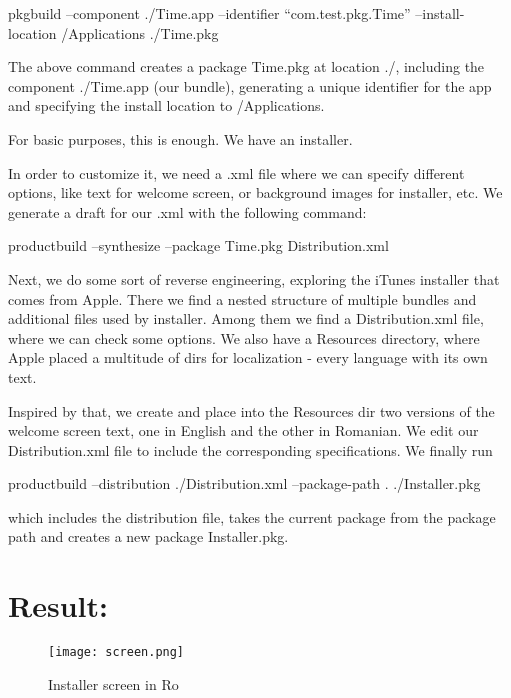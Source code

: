 \documentclass{article}        %
\begin{document}
\vspace{0.3 cm}
 {
\selectfont 
pkgbuild --component ./Time.app --identifier ``com.test.pkg.Time'' --install-location /Applications ./Time.pkg
}
\vspace{0.3 cm}

The above command creates a package Time.pkg at location ./, including the component ./Time.app (our bundle), generating a unique identifier for the app and specifying the install location to /Applications.

For basic purposes, this is enough. We have an installer. 

In order to customize it, we need a .xml file where we can specify different options, like text for welcome screen, or background images for installer, etc. We generate a draft for our .xml with the following command:

\vspace{0.3 cm}
{
\selectfont
productbuild --synthesize --package Time.pkg Distribution.xml
}
\vspace{0.3 cm}

Next, we do some sort of reverse engineering, exploring the iTunes installer that comes from Apple. There we find a nested structure of multiple bundles and additional files used by installer. Among them we find a Distribution.xml file, where we can check some options. We also have a Resources directory, where Apple placed a multitude of dirs for localization - every language with its own text.

Inspired by that, we create and place into the Resources dir two versions of the welcome screen text, one in English and the other in Romanian. We edit our Distribution.xml file to include the corresponding specifications. We finally run

\vspace{0.3 cm}
{
\selectfont
productbuild --distribution ./Distribution.xml --package-path . ./Installer.pkg
}
\vspace{0.3 cm}

which includes the distribution file, takes the current package from the package path and creates a new package Installer.pkg.

\section*{Result:}

\begin{figure}[ht!]
\centering
\texttt{[image: screen.png]}
\caption{Installer screen in Ro}
\label{screen}
\end{figure}
\end{document}
